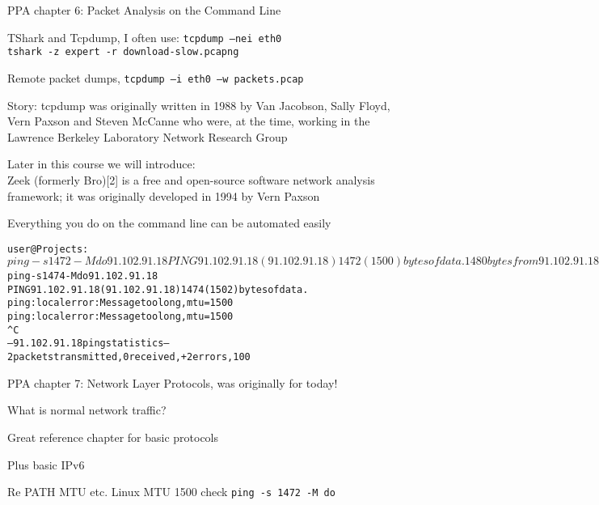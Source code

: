 \documentclass[Screen16to9,17pt]{foils}
\begin{document}
\begin{list1}
\item PPA chapter 6: Packet Analysis on the Command Line
\begin{list2}
\item TShark and Tcpdump, I often use: \verb+tcpdump –nei eth0+\\
\verb+tshark -z expert -r download-slow.pcapng+

\item Remote packet dumps, \verb+tcpdump –i eth0 –w packets.pcap+
\end{list2}
\item Story: tcpdump was originally written in 1988 by Van Jacobson, Sally Floyd, Vern Paxson and Steven McCanne who were, at the time, working in the Lawrence Berkeley Laboratory Network Research Group

\item Later in this course we will introduce:\\
Zeek (formerly Bro)[2] is a free and open-source software network analysis framework; it was originally developed in 1994 by Vern Paxson
\end{list1}

\vskip 5mm
\centerline{\Large Everything you do on the command line can be automated easily}



\begin{alltt}\footnotesize
user@Projects:~$ ping -s 1472 -M do 91.102.91.18
PING 91.102.91.18 (91.102.91.18) 1472(1500) bytes of data.
1480 bytes from 91.102.91.18: icmp_seq=1 ttl=244 time=7.43 ms
1480 bytes from 91.102.91.18: icmp_seq=2 ttl=244 time=7.20 ms
...
user@Projects:~$ ping -s 1474 -M do 91.102.91.18
PING 91.102.91.18 (91.102.91.18) 1474(1502) bytes of data.
ping: local error: Message too long, mtu=1500
ping: local error: Message too long, mtu=1500
^C
--- 91.102.91.18 ping statistics ---
2 packets transmitted, 0 received, +2 errors, 100% packet loss, time 1025ms
\end{alltt}

\begin{list1}
\item PPA chapter 7: Network Layer Protocols, was originally for today!
\begin{list2}
\item What is normal network traffic?
\item Great reference chapter for basic protocols
\item Plus basic IPv6
\item Re PATH MTU etc. Linux MTU 1500 check \verb+ping -s 1472 -M do+
\end{list2}
\end{list1}
\end{document}
